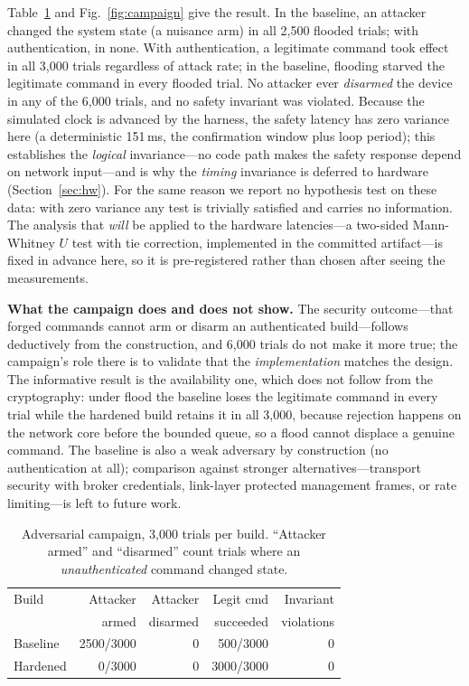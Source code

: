 Table~\ref{tab:campaign} and Fig.~\ref{fig:campaign} give the result. In the baseline, an
attacker changed the system state (a nuisance arm) in all 2{,}500 flooded trials; with
authentication, in none. With authentication, a legitimate command took effect in all 3{,}000
trials regardless of attack rate; in the baseline, flooding starved the legitimate command in
every flooded trial. No attacker ever \emph{disarmed} the device in any of the 6{,}000 trials,
and no safety invariant was violated. Because the simulated clock is advanced by the harness,
the safety latency has zero variance here (a deterministic 151\,ms, the confirmation window plus
loop period); this establishes the \emph{logical} invariance---no code path makes the safety
response depend on network input---and is why the \emph{timing} invariance is deferred to
hardware (Section~\ref{sec:hw}). For the same reason we report no hypothesis test on these
data: with zero variance any test is trivially satisfied and carries no information. The
analysis that \emph{will} be applied to the hardware latencies---a two-sided Mann-Whitney $U$
test with tie correction, implemented in the committed artifact---is fixed in advance here, so
it is pre-registered rather than chosen after seeing the measurements.

\textbf{What the campaign does and does not show.} The security outcome---that forged commands
cannot arm or disarm an authenticated build---follows deductively from the construction, and
6{,}000 trials do not make it more true; the campaign's role there is to validate that the
\emph{implementation} matches the design. The informative result is the availability one, which
does not follow from the cryptography: under flood the baseline loses the legitimate command in
every trial while the hardened build retains it in all 3{,}000, because rejection happens on the
network core before the bounded queue, so a flood cannot displace a genuine command. The
baseline is also a weak adversary by construction (no authentication at all); comparison against
stronger alternatives---transport security with broker credentials, link-layer protected
management frames, or rate limiting---is left to future work.

\begin{table}[t]
\centering
\caption{Adversarial campaign, 3{,}000 trials per build. ``Attacker armed'' and ``disarmed''
count trials where an \emph{unauthenticated} command changed state.}
\label{tab:campaign}
\small
\begin{tabular}{@{}lrrrr@{}}
\toprule
Build & Attacker & Attacker & Legit cmd & Invariant\\
      & armed    & disarmed & succeeded & violations\\
\midrule
Baseline  & 2500/3000 & 0 & 500/3000  & 0\\
Hardened  & 0/3000    & 0 & 3000/3000 & 0\\
\bottomrule
\end{tabular}
\end{table}

